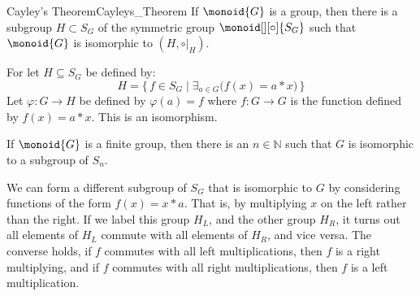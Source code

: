 \documentclass{article}                                                        %
\begin{document}
            \begin{ftheorem}{Cayley's Theorem}{Cayleys_Theorem}
                If $\monoid{G}$ is a group, then there is a subgroup
                $H\subset{S}_{G}$ of the symmetric group
                $\monoid[][\circ]{S_{G}}$ such that $\monoid{G}$ is isomorphic
                to $(H,\circ|_{H})$.
            \end{ftheorem}
            \begin{bproof}
                For let $H\subseteq{S}_{G}$ be defined by:
                \begin{equation}
                    H=\{\,f\in{S}_{G}\;|\;
                        \exists_{a\in{G}}\big(f(x)=a*x\big)\,\}
                \end{equation}
                Let $\varphi:G\rightarrow{H}$ be defined by
                $\varphi(a)=f$ where $f:G\rightarrow{G}$ is the function defined
                by $f(x)=a*x$. This is an isomorphism.
            \end{bproof}
            \begin{theorem}
                If $\monoid{G}$ is a finite group, then there is an
                $n\in\mathbb{N}$ such that $G$ is isomorphic to a subgroup of
                $S_{n}$.
            \end{theorem}
            We can form a different subgroup of $S_{G}$ that is isomorphic to
            $G$ by considering functions of the form $f(x)=x*a$. That is, by
            multiplying $x$ on the left rather than the right. If we label this
            group $H_{L}$, and the other group $H_{R}$, it turns out all
            elements of $H_{L}$ commute with all elements of $H_{R}$, and vice
            versa. The converse holds, if $f$ commutes with all left
            multiplications, then $f$ is a right multiplying, and if $f$
            commutes with all right multiplications, then $f$ is a left
            multiplication.
\end{document}
